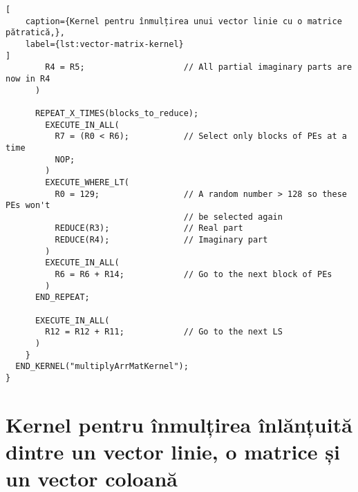 \begin{lstlisting}[
    caption={Kernel pentru înmulțirea unui vector linie cu o matrice pătratică,},
    label={lst:vector-matrix-kernel}
]
        R4 = R5;                    // All partial imaginary parts are now in R4
      )

      REPEAT_X_TIMES(blocks_to_reduce);
        EXECUTE_IN_ALL(
          R7 = (R0 < R6);           // Select only blocks of PEs at a time
          NOP;
        )
        EXECUTE_WHERE_LT(
          R0 = 129;                 // A random number > 128 so these PEs won't
                                    // be selected again
          REDUCE(R3);               // Real part
          REDUCE(R4);               // Imaginary part
        )
        EXECUTE_IN_ALL(
          R6 = R6 + R14;            // Go to the next block of PEs
        )
      END_REPEAT;

      EXECUTE_IN_ALL(
        R12 = R12 + R11;            // Go to the next LS
      )
    }
  END_KERNEL("multiplyArrMatKernel");
}
\end{lstlisting}

\section{Kernel pentru înmulțirea înlănțuită dintre un vector linie, o matrice
și un vector coloană}
\label{sec:kernel-mult-chained}

